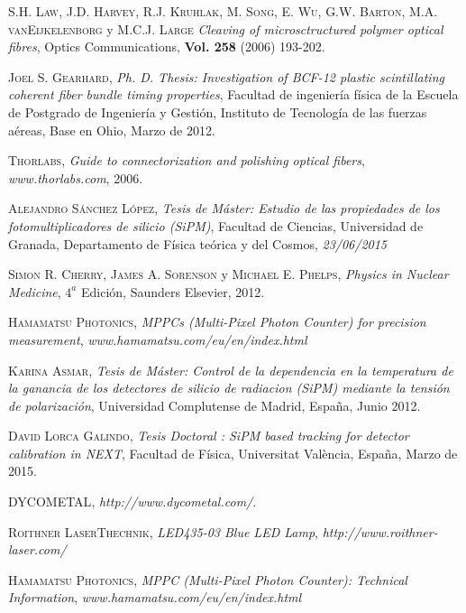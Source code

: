 \begin{thebibliography}{99}
 \textsc{S.H. Law}, \textsc{J.D. Harvey}, \textsc{R.J. Kruhlak}, \textsc{M. Song}, \textsc{E. Wu}, \textsc{G.W. Barton}, \textsc{M.A. vanEijkelenborg} y \textsc{M.C.J. Large}
\textit{Cleaving of microsctructured polymer optical fibres}, Optics Communications, \textbf{Vol. 258} (2006) 193-202.

 \textsc{Joel S. Gearhard},
\textit{ Ph. D. Thesis: Investigation of BCF-12 plastic scintillating coherent fiber bundle timing properties}, Facultad de ingeniería física de la Escuela de Postgrado de Ingeniería y Gestión, Instituto de Tecnología de las fuerzas aéreas, Base en Ohio, Marzo de 2012.

 \textsc{Thorlabs},
\textit{Guide to connectorization and polishing optical fibers}, \textit{www.thorlabs.com}, 2006.

 \textsc{Alejandro Sánchez López},
\textit{Tesis de Máster: Estudio de las propiedades de los fotomultiplicadores de silicio (SiPM)}, Facultad de Ciencias, Universidad de Granada, Departamento de Física teórica y del Cosmos, \textit{23/06/2015}

 \textsc{Simon R. Cherry}, \textsc{James A. Sorenson} y \textsc{Michael E. Phelps},
\textit{Physics in Nuclear Medicine}, $4^a$ Edición, Saunders Elsevier, 2012.

 \textsc{Hamamatsu Photonics},
\textit{MPPCs (Multi-Pixel Photon Counter) for precision measurement}, \textit{www.hamamatsu.com/eu/en/index.html}

 \textsc{Karina Asmar},
\textit{Tesis de Máster: Control de la dependencia en la temperatura de la ganancia de los detectores de silicio de radiacion (SiPM) mediante la tensión de polarización}, Universidad Complutense de Madrid, España, Junio 2012.

 \textsc{David Lorca Galindo},
\textit{Tesis Doctoral : SiPM based tracking for detector calibration in NEXT}, Facultad de Física, Universitat  València, España, Marzo de 2015.

 \textsc{DYCOMETAL},
\textit{http://www.dycometal.com/}.

 \textsc{Roithner LaserThechnik},
\textit{LED435-03 Blue LED Lamp}, \textit{http://www.roithner-laser.com/}

 \textsc{Hamamatsu Photonics},
\textit{MPPC (Multi-Pixel Photon Counter): Technical Information}, \textit{www.hamamatsu.com/eu/en/index.html}


\end{thebibliography}
